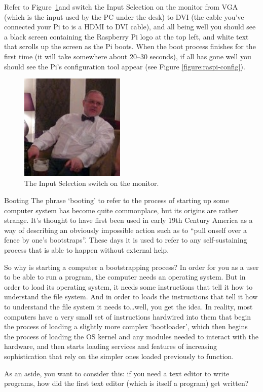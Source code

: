 Refer to Figure~\ref{figure:monitorswitch}and switch the Input Selection on the monitor from VGA (which is the input used by the PC under the desk) to DVI (the cable you've connected your Pi to is a HDMI to DVI cable), and all being well you should see a black screen containing the Raspberry Pi logo at the top left, and white text that scrolls up the screen as the Pi boots. When the boot process finishes for the first time (it will take somewhere about 20--30 seconds), if all has gone well you should see the Pi's configuration tool appear (see Figure \ref{figure:raspi-config}).

\begin{figure}
\centerline{\includegraphics[width=5cm]{images/mysteryimage}}
\caption{The Input Selection switch on the monitor.}\label{figure:monitorswitch}
\end{figure}

\begin{diversion}{Booting}
\label{bootbox}
The phrase `booting' to refer to the process of starting up some computer system has become quite commonplace, but its origins are rather strange. It's thought to have first been used in early 19th Century America as a way of describing an obviously impossible action such as to ``pull onself over a fence by one's bootstraps''. These days it is used to refer to any self-sustaining process that is able to happen without external help. 

So why is starting a computer a bootstrapping process? In order for you as a user to be able to run a program, the computer needs an operating system. But in order to load its operating system, it needs some instructions that tell it how to understand the file system. And in order to loads the instructions that tell it how to understand the file system it needs to\ldots well, you get the idea. In reality, most computers have a very small set of instructions hardwired into them that begin the process of loading a  slightly more complex `bootloader', which then begins the process of loading the OS kernel and any modules needed to interact with the hardware, and then starts loading services and features of increasing sophistication that rely on the simpler ones loaded previously to function. 

As an aside, you want to consider this: if you need a text editor to write programs, how did the first text editor (which is itself a program) get written?
\end{diversion}

